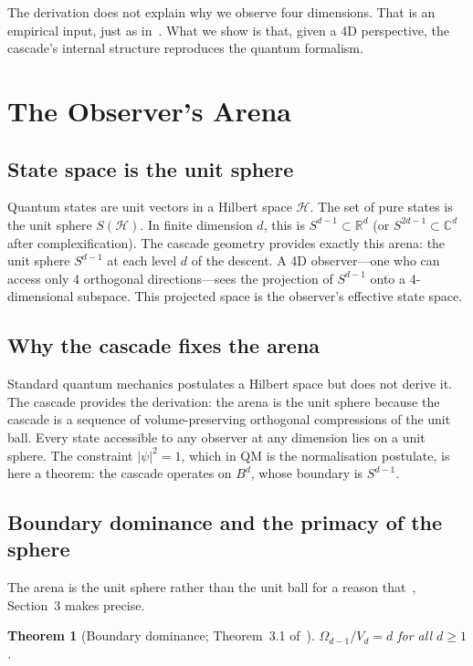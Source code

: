 \documentclass[12pt,a4paper]{article}
\newtheorem{theorem}{Theorem}[section]
\begin{document}
The derivation does not explain why we observe four dimensions. That is an empirical input,
just as in~\cite{part0}. What we show is that, given a 4D perspective, the cascade's
internal structure reproduces the quantum formalism.

\section{The Observer's Arena}\label{sec:the-observer-s-arena}

\subsection{State space is the unit sphere}

Quantum states are unit vectors in a Hilbert space $\mathcal{H}$. The set of pure states is
the unit sphere $S(\mathcal{H})$. In finite dimension $d$, this is $S^{d-1}\subset\mathbb{R}^d$
(or $S^{2d-1}\subset\mathbb{C}^d$ after complexification). The cascade geometry provides
exactly this arena: the unit sphere $S^{d-1}$ at each level $d$ of the descent. A 4D
observer---one who can access only 4 orthogonal directions---sees the projection of
$S^{d-1}$ onto a 4-dimensional subspace. This projected space is the observer's effective
state space.

\subsection{Why the cascade fixes the arena}

Standard quantum mechanics postulates a Hilbert space but does not derive it. The cascade
provides the derivation: the arena is the unit sphere because the cascade is a sequence of
volume-preserving orthogonal compressions of the unit ball. Every state accessible to any
observer at any dimension lies on a unit sphere. The constraint $|\psi|^2=1$, which in QM
is the normalisation postulate, is here a theorem: the cascade operates on $B^d$, whose
boundary is $S^{d-1}$.

\subsection{Boundary dominance and the primacy of the sphere}

The arena is the unit sphere rather than the unit ball for a reason that~\cite{part0},
Section~3 makes precise.

\begin{theorem}[Boundary dominance; Theorem~3.1 of~\cite{part0}]
$\Omega_{d-1}/V_d=d$ for all $d\geq 1$.
\end{theorem}
\end{document}
